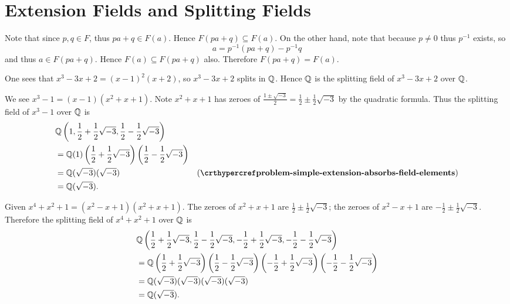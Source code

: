\section{Extension Fields and Splitting Fields}
\begin{questions}
    \item Note that since $p, q \in F$, thus $pa + q \in F(a)$. Hence $F(pa+q) \subseteq F(a)$. On the other hand, note that because $p \neq 0$ thus $p^{-1}$ exists, so
    \[
        a = p^{-1}(pa+q) - p^{-1}q
    \]
    and thus $a \in F(pa+q)$. Hence $F(a) \subseteq F(pa+q)$ also. Therefore $F(pa+q) = F(a)$.
    
    \item \begin{partquestions}{\alph*}
        \item One sees that $x^3-3x+2 = (x-1)^2(x+2)$, so $x^3-3x+2$ splits in $\mathbb{Q}$. Hence $\mathbb{Q}$ is the splitting field of $x^3-3x+2$ over $\mathbb{Q}$.
        
        \item We see $x^3 - 1 = (x-1)(x^2+x+1)$. Note $x^2 + x + 1$ has zeroes of $\frac{1\pm\sqrt{-3}}{2} = \frac12 \pm \frac12\sqrt{-3}$ by the quadratic formula. Thus the splitting field of $x^3 - 1$ over $\mathbb{Q}$ is
        \begin{align*}
            &\Q\left(1, \frac12 + \frac12\sqrt{-3}, \frac12 - \frac12\sqrt{-3}\right)\\
            &=\Q(1)\left(\frac12 + \frac12\sqrt{-3}\right)\left(\frac12 - \frac12\sqrt{-3}\right)\\
            &=\Q(\sqrt{-3})(\sqrt{-3}) & (\myref{problem-simple-extension-absorbs-field-elements})\\
            &=\Q(\sqrt{-3}).
        \end{align*}
        
        \item Given $x^4 + x^2 + 1 = (x^2 - x + 1)(x^2 + x + 1)$. The zeroes of $x^2 + x + 1$ are $\frac12 \pm \frac12\sqrt{-3}$; the zeroes of $x^2 - x + 1$ are $-\frac12 \pm \frac12\sqrt{-3}$. Therefore the splitting field of $x^4 + x^2 + 1$ over $\mathbb{Q}$ is
        \begin{align*}
            &\mathbb{Q}\left(\frac12 + \frac12\sqrt{-3}, \frac12 - \frac12\sqrt{-3}, -\frac12 + \frac12\sqrt{-3}, -\frac12 - \frac12\sqrt{-3}\right)\\
            &=\mathbb{Q}\left(\frac12 + \frac12\sqrt{-3}\right)\left(\frac12 - \frac12\sqrt{-3}\right)\left(-\frac12 + \frac12\sqrt{-3}\right)\left(-\frac12 - \frac12\sqrt{-3}\right)\\
            &=\mathbb{Q}(\sqrt{-3})(\sqrt{-3})(\sqrt{-3})(\sqrt{-3})\\
            &= \mathbb{Q}(\sqrt{-3}).
        \end{align*}
        

\end{partquestions}
\end{questions}
